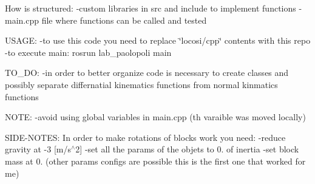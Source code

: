How is structured\+: -\/custom libraries in src and include to implement functions -\/main.\+cpp file where functions can be called and tested

U\+S\+A\+GE\+: -\/to use this code you need to replace \char`\"{}locosi/cpp\char`\"{} contents with this repo -\/to execute main\+: rosrun lab\+\_\+paolopoli main

T\+O\+\_\+\+DO\+: -\/in order to better organize code is necessary to create classes and possibly separate differnatial kinematics functions from normal kinmatics functions

N\+O\+TE\+: -\/avoid using global variables in main.\+cpp (th varaible was moved locally)

S\+I\+D\+E-\/\+N\+O\+T\+ES\+: In order to make rotations of blocks work you need\+: -\/reduce gravity at -\/3 \mbox{[}m/s$^\wedge$2\mbox{]} -\/set all the params of the objets to 0. of inertia -\/set block mass at 0. (other params configs are possible this is the first one that worked for me) 